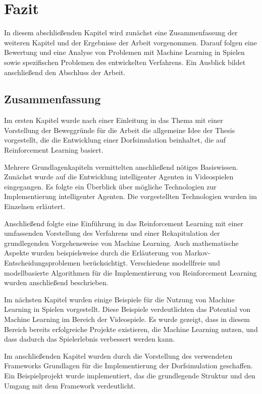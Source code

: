 \chapter{Fazit}\label{fazit}
In diesem abschließenden Kapitel wird zunächst eine Zusammenfassung der weiteren Kapitel und der Ergebnisse der Arbeit vorgenommen. Darauf folgen eine Bewertung und eine Analyse von Problemen mit Machine Learning in Spielen sowie spezifischen Problemen des entwickelten Verfahrens. Ein Ausblick bildet anschließend den Abschluss der Arbeit.


\section{Zusammenfassung}\label{zusammenfassung}
Im ersten Kapitel wurde nach einer Einleitung in das Thema mit einer Vorstellung der Beweggründe für die Arbeit die allgemeine Idee der Thesis vorgestellt, die die Entwicklung einer Dorfsimulation beinhaltet, die auf Reinforcement Learning basiert.

Mehrere Grundlagenkapiteln vermittelten anschließend nötiges Basiswissen. Zunächst wurde auf die Entwicklung intelligenter Agenten in Videospielen eingegangen. Es folgte ein Überblick über mögliche Technologien zur Implementierung intelligenter Agenten. Die vorgestellten Technologien wurden im Einzelnen erläutert.

Anschließend folgte eine Einführung in das Reinforcement Learning mit einer umfassenden Vorstellung des Verfahrens und einer Rekapitulation der grundlegenden Vorgehensweise von Machine Learning. Auch mathematische Aspekte wurden beispielsweise durch die Erläuterung von Markov-Entscheidungsproblemen berücksichtigt. Verschiedene modellfreie und modellbasierte Algorithmen für die Implementierung von Reinforcement Learning wurden anschließend beschrieben. 

Im nächsten Kapitel wurden einige Beispiele für die Nutzung von Machine Learning in Spielen vorgestellt. Diese Beispiele verdeutlichten das Potential von Machine Learning im Bereich der Videospiele. Es wurde gezeigt, dass in diesem Bereich bereits erfolgreiche Projekte existieren, die Machine Learning nutzen, und dass dadurch das Spielerlebnis verbessert werden kann.

Im anschließenden Kapitel wurden durch die Vorstellung des verwendeten Frameworks Grundlagen für die Implementierung der Dorfsimulation geschaffen. Ein Beispielprojekt wurde implementiert, das die grundlegende Struktur und den Umgang mit dem Framework verdeutlicht.

